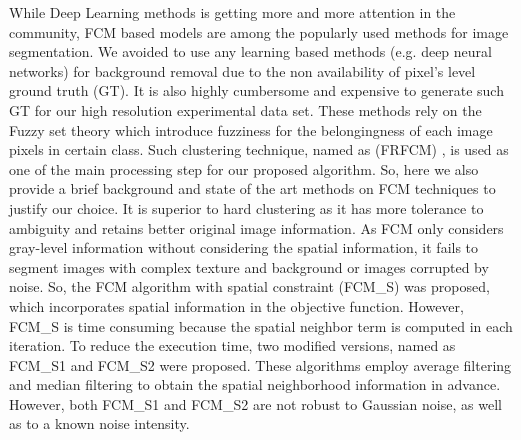 \documentclass[runningheads]{llncs}
\begin{document}
While Deep Learning methods is getting more and more attention in the community, FCM \cite{Lei2017} based models are among the popularly used methods for image segmentation. We avoided to use any learning based methods (e.g. deep neural networks) for background removal due to the non availability of pixel's level ground truth (GT). It is also highly cumbersome and expensive to generate such GT for our high resolution experimental data set. These methods rely on the Fuzzy set theory which introduce fuzziness for the belongingness of each image pixels in certain class. Such clustering technique, named as (FRFCM) \cite{Lei2017} , is used as one of the main processing step for our proposed algorithm. So, here we also provide a brief background and state of the art methods on FCM techniques to justify our choice.
It is superior to hard clustering as it has more tolerance to ambiguity and retains better original image information. 
As FCM only considers gray-level information without considering the spatial information, it fails to segment images with complex texture and background or images corrupted by noise. So, the FCM algorithm with spatial constraint (FCM\_S) \cite{Lei2017} was proposed, which incorporates spatial information in the objective function. However, FCM\_S is time consuming because the spatial neighbor term is computed in each iteration.
To reduce the execution time, two modified versions, named as FCM\_S1 and FCM\_S2 \cite{Lei2017} were proposed. These algorithms employ average filtering and median filtering to obtain the spatial neighborhood information in advance. However, both FCM\_S1 and FCM\_S2 are not robust to Gaussian noise, as well as to a known noise intensity.
\end{document}
